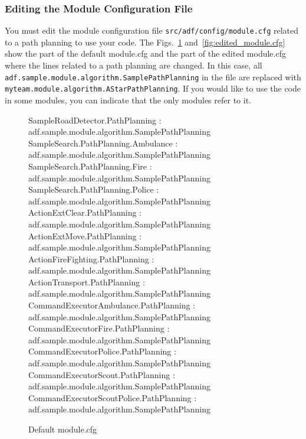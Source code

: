 \documentclass{article}
\begin{document}
\subsubsection{Editing the Module Configuration File}
\label{subsubsec:module.cfg}
You must edit the module configuration file \texttt{src/adf/config/module.cfg} related to a path planning to use your code. The Figs.~\ref{fig:default_module.cfg} and~\ref{fig:edited_module.cfg} show the part of the default module.cfg and the part of the edited module.cfg where the lines related to a path planning are changed. In this case, all \texttt{adf.sample.module.algorithm.SamplePathPlanning} in the file are replaced with \texttt{myteam.module.algorithm.AStarPathPlanning}. If you would like to use the code in some modules, you can indicate that the only modules refer to it.
\begin{figure}[ht]
 \begin{center}
  \begin{screen}
   {\ttfamily
SampleRoadDetector.PathPlanning : adf.sample.module.algorithm.SamplePathPlanning\\
SampleSearch.PathPlanning.Ambulance : adf.sample.module.algorithm.SamplePathPlanning\\
SampleSearch.PathPlanning.Fire : adf.sample.module.algorithm.SamplePathPlanning\\
SampleSearch.PathPlanning.Police : adf.sample.module.algorithm.SamplePathPlanning\\
ActionExtClear.PathPlanning : adf.sample.module.algorithm.SamplePathPlanning\\
ActionExtMove.PathPlanning : adf.sample.module.algorithm.SamplePathPlanning\\
ActionFireFighting.PathPlanning : adf.sample.module.algorithm.SamplePathPlanning\\
ActionTransport.PathPlanning : adf.sample.module.algorithm.SamplePathPlanning\\
CommandExecutorAmbulance.PathPlanning : adf.sample.module.algorithm.SamplePathPlanning\\
CommandExecutorFire.PathPlanning : adf.sample.module.algorithm.SamplePathPlanning\\
CommandExecutorPolice.PathPlanning : adf.sample.module.algorithm.SamplePathPlanning\\
CommandExecutorScout.PathPlanning : adf.sample.module.algorithm.SamplePathPlanning\\
CommandExecutorScoutPolice.PathPlanning : adf.sample.module.algorithm.SamplePathPlanning
}
  \end{screen}
  \caption{Default module.cfg}
  \label{fig:default_module.cfg}
 \end{center}
\end{figure}
\end{document}
